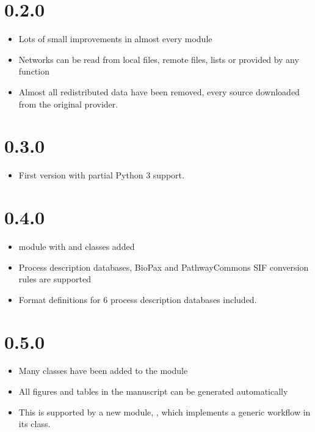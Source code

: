 \documentclass[letterpaper,10pt,english]{sphinxmanual}
\begin{document}
\section{0.2.0}
\label{\detokenize{changelog:id2}}\begin{itemize}
\item {} 
Lots of small improvements in almost every module

\item {} 
Networks can be read from local files, remote files, lists or provided by
any function

\item {} 
Almost all redistributed data have been removed, every source downloaded
from the original provider.

\end{itemize}


\section{0.3.0}
\label{\detokenize{changelog:id3}}\begin{itemize}
\item {} 
First version with partial Python 3 support.

\end{itemize}


\section{0.4.0}
\label{\detokenize{changelog:id4}}\begin{itemize}
\item {} 
 module with  and  classes added

\item {} 
Process description databases, BioPax and PathwayCommons SIF conversion
rules are supported

\item {} 
Format definitions for 6 process description databases included.

\end{itemize}


\section{0.5.0}
\label{\detokenize{changelog:id5}}\begin{itemize}
\item {} 
Many classes have been added to the  module

\item {} 
All figures and tables in the manuscript can be generated automatically

\item {} 
This is supported by a new module, , which implements a generic
workflow in its  class.

\end{itemize}
\end{document}
